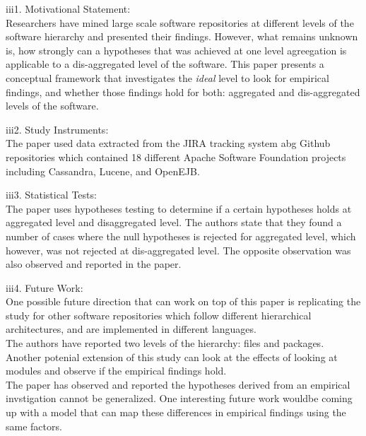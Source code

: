 \documentclass[12pt]{article}
\begin{document}
\begin{itemize}
\begin{item}
iii1. Motivational Statement: \\
Researchers have mined large scale software repositories at different levels 
of the software hierarchy and presented their findings. However, what remains 
unknown is,  how strongly can a hypotheses that was achieved at one level agreegation is 
applicable to a dis-aggregated level of the software.  This paper presents a conceptual 
framework that investigates the \textit{ideal} level 
to look for empirical findings, and whether those findings hold for both: aggregated 
and dis-aggregated levels of the software.    
\end{item}
\begin{item}
iii2. Study Instruments: \\
The paper used data extracted from the JIRA tracking system abg Github repositories 
which contained 18 different Apache Software Foundation projects including Cassandra,  
Lucene, and OpenEJB. 

\end{item}
\begin{item}
iii3. Statistical Tests: \\
The paper uses hypotheses testing to determine if a certain hypotheses 
holds at aggregated level and disaggregated level. The authors state that  
they found a number of cases where the null hypotheses is rejected 
for aggregated level, which however, was not rejected at dis-aggregated level. 
The opposite observation was also observed and reported in the paper.  

\end{item}
\begin{item}
iii4. Future Work: \\
One possible future direction that can work on top of  this 
paper is replicating the study for other software repositories 
which follow different hierarchical architectures, and are implemented 
in different languages. \\ 
The authors have reported two levels of the hierarchy: files and packages. 
Another potenial extension of this study can look at the effects of looking 
at modules and observe if the empirical findings hold. \\
The paper has observed and reported the hypotheses derived 
from an empirical invstigation cannot be generalized. One interesting future 
work wouldbe coming up with a model that can map these differences 
in empirical findings using the same factors.      

\end{item}
\end{itemize} 
\end{document}
